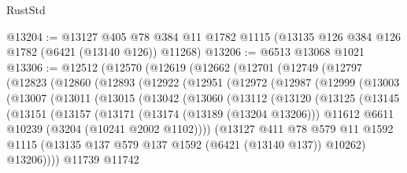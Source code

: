 \begin{lexlean}{RustStd}
\begin{coremodule}
@13204 := @13127
    @405
    @78
    @384
    @11
    @1782
    @1115
    (@13135 @126 @384 @126 @1782 (@6421 (@13140 @126)) @11268)
@13206 := @6513 @13068 @1021
@13306 := @12512
    (@12570
      (@12619
        (@12662
          (@12701
            (@12749
              (@12797
                (@12823
                  (@12860
                    (@12893
                      (@12922
                        (@12951
                          (@12972
                            (@12987
                              (@12999
                                (@13003
                                  (@13007
                                    (@13011
                                      (@13015
                                        (@13042
                                          (@13060
                                            (@13112
                                              (@13120
                                                (@13125
                                                  (@13145
                                                    (@13151
                                                      (@13157
                                                        (@13171
                                                          (@13174 (@13189 (@13204 @13206)))
                                                          @11612
                                                          @6611
                                                          @10239
                                                          (@3204 (@10241 @2002 @1102))))
                                                      (@13127
                                                        @411
                                                        @78
                                                        @579
                                                        @11
                                                        @1592
                                                        @1115
                                                        (@13135
                                                          @137
                                                          @579
                                                          @137
                                                          @1592
                                                          (@6421 (@13140 @137))
                                                          @10262)
                                                        @13206))))
                                                @11739
                                                @11742

\end{coremodule}
\end{lexlean}
